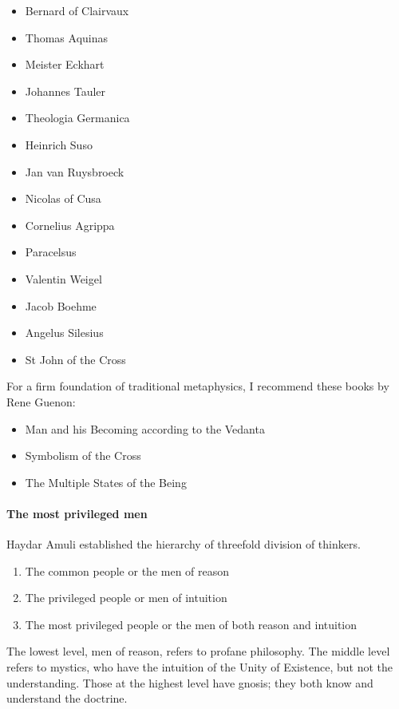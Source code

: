 \begin{itemize}[nosep]
\item Bernard of Clairvaux 
\item Thomas Aquinas 
\item Meister Eckhart 
\item Johannes Tauler 
\item Theologia Germanica 
\item Heinrich Suso 
\item Jan van Ruysbroeck 
\item Nicolas of Cusa 
\item Cornelius Agrippa 
\item Paracelsus 
\item Valentin Weigel 
\item Jacob Boehme 
\item Angelus Silesius 
\item St John of the Cross 
\end{itemize}

\phantom{.}

For a firm foundation of traditional metaphysics, I recommend these books by Rene Guenon:

\begin{itemize}
\item Man and his Becoming according to the Vedanta 
\item Symbolism of the Cross 
\item The Multiple States of the Being 
\end{itemize}
\paragraph{The most privileged men}
Haydar Amuli established the hierarchy of threefold division of thinkers.

\begin{enumerate}
\item The common people or the men of reason 
\item The privileged people or men of intuition 
\item The most privileged people or the men of both reason and intuition 
\end{enumerate}
The lowest level, men of reason, refers to profane philosophy. The middle level refers to mystics, who have the intuition of the Unity of Existence, but not the understanding. Those at the highest level have gnosis; they both know and understand the doctrine.

